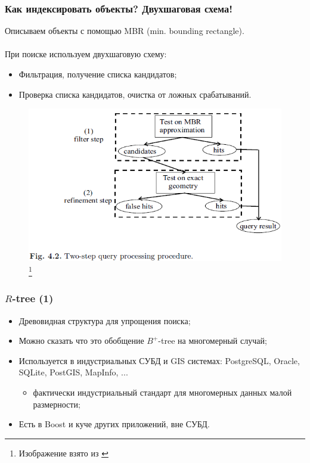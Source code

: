 \documentclass{beamer}
\begin{document}
\begin{frame}
\frametitle{Как индексировать объекты? Двухшаговая схема!}

Описываем объекты с помощью MBR (min. bounding rectangle).\\~\\

При поиске используем двухшаговую схему:
\begin{itemize}
	\item Фильтрация, получение списка кандидатов;
	\item Проверка списка кандидатов, очистка от ложных срабатываний.
\end{itemize}


\begin{figure}[htb]
\includegraphics[width=\textwidth,height=0.55\textheight,keepaspectratio]{2step.png} 
\footnote{\tiny{Изображение взято из \cite{Manolopoulos2005}}}
\end{figure}   

\end{frame}

\begin{frame}
\frametitle{$R$-tree (1)}
\begin{itemize}
  \setlength\itemsep{1em}
  \item Древовидная структура для упрощения поиска;
  \item Можно сказать что это обобщение $B^{+}$-tree на многомерный случай;
  \item Используется в индустриальных СУБД и GIS системах: PostgreSQL, Oracle, SQLite, PostGIS, MapInfo, ... 
  \begin{itemize}
    \item фактически индустриальный стандарт для многомерных данных малой размерности;
  \end{itemize}
  \item Есть в Boost и куче других приложений, вне СУБД.
\end{itemize}

\end{frame}
\end{document}

